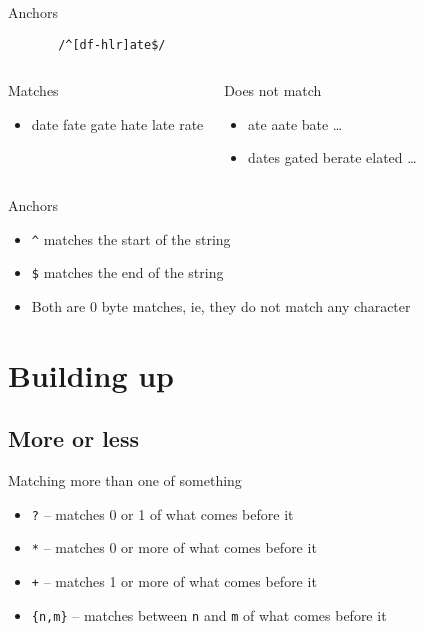 \documentclass{beamer}
\begin{document}
\begin{frame}[fragile]{Anchors}
  \begin{verbatim}
       /^[df-hlr]ate$/
  \end{verbatim}
  \begin{columns}[t]
      \begin{block}{Matches}
        \begin{itemize}
        \item date fate gate hate late rate
        \end{itemize}
      \end{block}
      \begin{block}{Does not match}
        \begin{itemize}
        \item ate aate bate \ldots
        \item dates gated berate elated \ldots
        \end{itemize}
      \end{block}
  \end{columns}
\end{frame}

\begin{frame}[fragile]{Anchors}
  \begin{itemize}
  \item \texttt{\^} matches the start of the string
  \item \texttt{\$} matches the end of the string
  \item Both are 0 byte matches, ie, they do not match any character
  \end{itemize}
\end{frame}

\section{Building up}

\subsection{More or less}

\begin{frame}{Matching more than one of something}
  \begin{itemize}
  \item \texttt{?} -- matches 0 or 1 of what comes before it
  \item \texttt{*} -- matches 0 or more of what comes before it
  \item \texttt{+} -- matches 1 or more of what comes before it
  \item \texttt{\{n,m\}} -- matches between \texttt{n} and \texttt{m} of what comes before it
  \end{itemize}
\end{frame}
\end{document}
